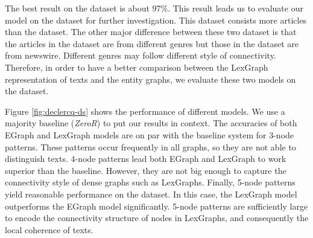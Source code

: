 The best result on the \pitlerds dataset is about 97\%. 
This result leads us to evaluate our model on the \declercqds dataset for further investigation. 
This dataset consists more articles than the \pitlerds dataset. 
The other major difference between these two dataset is that the articles in the \declercqds dataset are from different genres but those in the \pitlerds dataset are from newswire. 
Different genres may follow different style of connectivity. 
Therefore, in order to have a better comparison between the LexGraph representation of texts and the entity graphs, we evaluate these two models on the \declercqds dataset. 

Figure \ref{fig:declercq-ds} shows the performance of different models.   
We use a majority baseline (\emph{ZeroR}) to put our results in context. 
The accuracies of both EGraph and LexGraph models are on par with the baseline system for 3-node patterns. 
These patterns occur frequently in all graphs, so they are not able to distinguish texts. 
4-node patterns lead both EGraph and LexGraph to work superior than the baseline. 
However, they are not big enough to capture the connectivity style of dense graphs such as LexGraphs. 
Finally, 5-node patterns yield reasonable performance on the \declercqds dataset. 
In this case, the LexGraph model outperforms the EGraph model significantly. 
5-node patterns are sufficiently large to encode the connectivity structure of nodes in LexGraphs, and consequently the local coherence of texts. 





